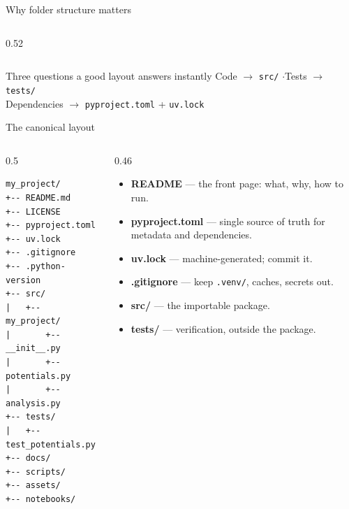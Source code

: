 \documentclass[aspectratio=169]{beamer}
\begin{document}
\begin{frame}{Why folder structure matters}
\begin{columns}[T]
\begin{column}{0.52\textwidth}
\begin{center}
      \end{center}
    \end{column}
  \end{columns}
  \vspace{0.2cm}
  \begin{block}{Three questions a good layout answers instantly}
    Code $\rightarrow$ \texttt{src/} \enspace$\cdot$\enspace Tests $\rightarrow$ \texttt{tests/}\\
    Dependencies $\rightarrow$ \texttt{pyproject.toml} + \texttt{uv.lock}
  \end{block}
\end{frame}

\begin{frame}[fragile]{The canonical layout}
  \begin{columns}[T]
    \begin{column}{0.5\textwidth}
      \begin{lstlisting}[basicstyle=\ttfamily\scriptsize]
my_project/
+-- README.md
+-- LICENSE
+-- pyproject.toml
+-- uv.lock
+-- .gitignore
+-- .python-version
+-- src/
|   +-- my_project/
|       +-- __init__.py
|       +-- potentials.py
|       +-- analysis.py
+-- tests/
|   +-- test_potentials.py
+-- docs/
+-- scripts/
+-- assets/
+-- notebooks/
      \end{lstlisting}
    \end{column}
    \begin{column}{0.46\textwidth}
      \begin{itemize}
        \item \textbf{README} --- the front page: what, why, how to run.
        \item \textbf{pyproject.toml} --- single source of truth for metadata
              and dependencies.
        \item \textbf{uv.lock} --- machine-generated; commit it.
        \item \textbf{.gitignore} --- keep \texttt{.venv/}, caches, secrets out.
        \item \textbf{src/} --- the importable package.
        \item \textbf{tests/} --- verification, outside the package.
      \end{itemize}
    \end{column}
  \end{columns}
\end{frame}
\end{document}
